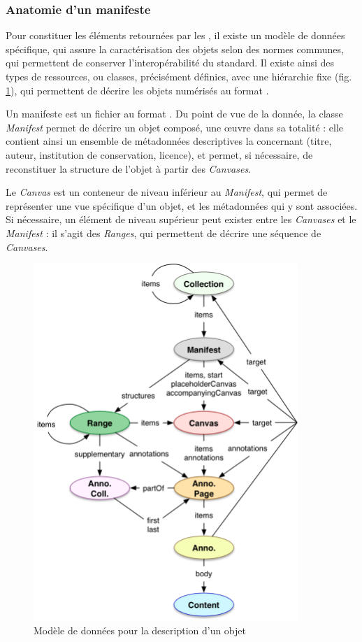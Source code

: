     \subsubsection{Anatomie d'un manifeste}
Pour constituer les éléments retournées par les \api \iiif, il existe un modèle de données spécifique, qui assure la caractérisation des objets selon des normes communes, qui permettent de conserver l'interopérabilité du standard. Il existe ainsi des types de ressources, ou classes, précisément définies, avec une hiérarchie fixe (fig. \ref{fig:iiif_data_model}), qui permettent de décrire les objets numérisés au format \json.

Un manifeste est un fichier au format \json. Du point de vue de la donnée, la classe \textit{Manifest} permet de décrire un objet composé, une œuvre dans sa totalité : elle contient ainsi un ensemble de métadonnées descriptives la concernant (titre, auteur, institution de conservation, licence), et permet, si nécessaire, de reconstituer la structure de l'objet à partir des \textit{Canvases}.

Le \textit{Canvas} est un conteneur de niveau inférieur au \textit{Manifest}, qui permet de représenter une vue spécifique d'un objet, et les métadonnées qui y sont associées. Si nécessaire, un élément de niveau supérieur peut exister entre les \textit{Canvases} et le \textit{Manifest} : il s'agit des \textit{Ranges}, qui permettent de décrire une séquence de \textit{Canvases}.

\begin{figure}[H]
	\centering
	\includegraphics[width=10cm]{images/modele_donnees_iiif.png}
	\caption{Modèle de données \iiif pour la description d'un objet}
	\label{fig:iiif_data_model}
\end{figure}

